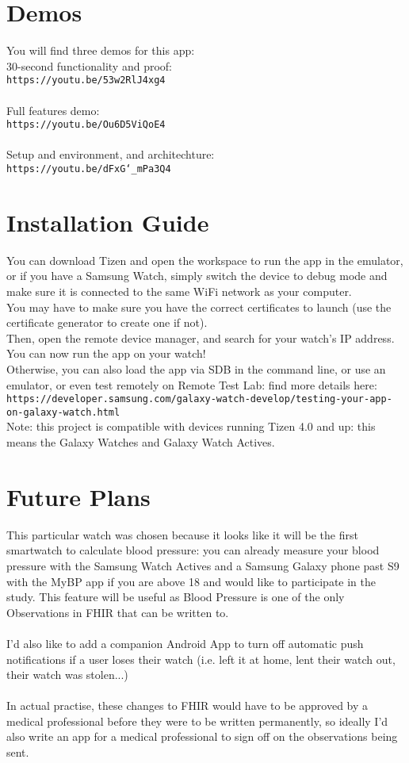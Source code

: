 \documentclass{article}
\begin{document}
	\section{Demos}
	You will find three demos for this app:\\
	30-second functionality and proof:\\
	\texttt{https://youtu.be/53w2RlJ4xg4}\\
	\\
	Full features demo:\\
	\texttt{https://youtu.be/Ou6D5ViQoE4}\\
	\\
	Setup and environment, and architechture:\\
	\texttt{https://youtu.be/dFxG\char`_mPa3Q4}
	\section{Installation Guide}
	You can download Tizen and open the workspace to run the app in the emulator, or if you have a Samsung Watch, simply switch the device to debug mode and make sure it is connected to the same WiFi network as your computer.\\
	You may have to make sure you have the correct certificates to launch (use the certificate generator to create one if not).\\	 
	Then, open the remote device manager, and search for your watch's IP address. You can now run the app on your watch!\\
	Otherwise, you can also load the app via SDB in the command line, or use an emulator, or even test remotely on Remote Test Lab: find more details here:\\
	\texttt{https://developer.samsung.com/galaxy-watch-develop/testing-your-app-on-galaxy-watch.html}\\
	Note: this project is compatible with devices running Tizen 4.0 and up: this means the Galaxy Watches and Galaxy Watch Actives.
	\section{Future Plans}
	This particular watch was chosen because it looks like it will be the first smartwatch to calculate blood pressure:
	you can already measure	your blood pressure with the Samsung Watch Actives and a Samsung Galaxy phone past S9 with the MyBP app if you are above 18 and would like to participate in the study. This feature will be useful as Blood Pressure is one of the only Observations in FHIR that can be written to.\\
	\\
	I'd also like to add a companion Android App to turn off automatic push notifications if a user loses their watch (i.e. left it at home, lent their watch out, their watch was stolen...)\\
	\\
	In actual practise, these changes to FHIR would have to be approved by a medical professional before they were to be written permanently, so ideally I'd also write an app for a medical professional to sign off on the observations being sent.
\end{document}
